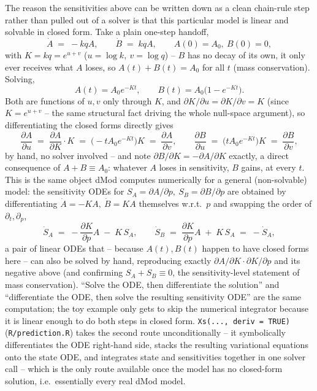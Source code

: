 \documentclass[11pt]{article}
\newcommand{\code}[1]{\texttt{#1}}
\newcommand{\file}[1]{\textcolor{black!60}{\texttt{#1}}}
\begin{document}
The reason the sensitivities above can be written down as a clean chain-rule
step rather than pulled out of a solver is that this particular model is
linear and solvable in closed form. Take a plain one-step handoff,
\begin{equation}
  \dot A \;=\; -kqA, \qquad \dot B \;=\; kqA, \qquad A(0)=A_0,\ B(0)=0,
\end{equation}
with $K=kq=e^{u+v}$ ($u=\log k,\ v=\log q$) -- $B$ has no decay of its own,
it only ever receives what $A$ loses, so $A(t)+B(t)=A_0$ for all $t$ (mass
conservation). Solving,
\begin{equation}
  A(t) = A_0e^{-Kt}, \qquad B(t) = A_0\big(1-e^{-Kt}\big).
\end{equation}
Both are functions of $u,v$ only through $K$, and $\partial K/\partial u =
\partial K/\partial v = K$ (since $K=e^{u+v}$ -- the same structural fact
driving the whole null-space argument), so differentiating the closed forms
directly gives
\begin{equation}
  \frac{\partial A}{\partial u} \;=\; \frac{\partial A}{\partial K}\cdot K
  \;=\; \big({-}tA_0e^{-Kt}\big)K \;=\; \frac{\partial A}{\partial v},
  \qquad
  \frac{\partial B}{\partial u} \;=\; \big(tA_0e^{-Kt}\big)K \;=\; \frac{\partial B}{\partial v},
\end{equation}
by hand, no solver involved -- and note $\partial B/\partial K = -\partial
A/\partial K$ exactly, a direct consequence of $A+B\equiv A_0$: whatever $A$
loses in sensitivity, $B$ gains, at every $t$. This is the same object dMod
computes numerically for a general (non-solvable) model: the sensitivity
ODEs for $S_A=\partial A/\partial p,\ S_B=\partial B/\partial p$ are obtained
by differentiating $\dot A=-KA,\ \dot B=KA$ themselves w.r.t.\ $p$ and
swapping the order of $\partial_t,\partial_p$,
\begin{equation}
  \dot S_A \;=\; -\frac{\partial K}{\partial p}A \;-\; K\,S_A,
  \qquad
  \dot S_B \;=\; \frac{\partial K}{\partial p}A \;+\; K\,S_A \;=\; -\dot S_A,
\end{equation}
a pair of linear ODEs that -- because $A(t),B(t)$ happen to have closed forms
here -- can also be solved by hand, reproducing exactly $\partial A/\partial
K\cdot\partial K/\partial p$ and its negative above (and confirming
$S_A+S_B\equiv 0$, the sensitivity-level statement of mass conservation).
``Solve the ODE, then differentiate the solution'' and ``differentiate the
ODE, then solve the resulting sensitivity ODE'' are the same computation; the
toy example only gets to skip the numerical integrator because it is linear
enough to do both steps in closed form. \code{Xs(..., deriv = TRUE)}
(\file{R/prediction.R}) takes the second route unconditionally -- it
symbolically differentiates the ODE right-hand side, stacks the resulting
variational equations onto the state ODE, and integrates state and
sensitivities together in one solver call -- which is the only route
available once the model has no closed-form solution, i.e.\ essentially
every real dMod model.
\end{document}
